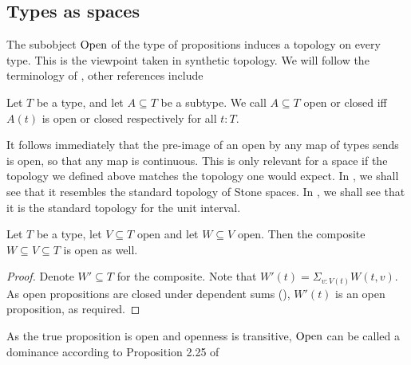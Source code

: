 \subsection{Types as spaces}
The subobject $\mathrm{Open}$ of the type of propositions induces a topology on every type. 
This is the viewpoint taken in synthetic topology. 
We will follow the terminology of \cite{SyntheticTopologyLesnik}, 
other references include \cite{SyntheticTopologyEscardo}%

\begin{definition}
  Let $T$ be a type, and let $A\subseteq T$ be a subtype. 
  We call $A\subseteq T$ open or closed iff $A(t)$ is open or closed respectively for all $t:T$.
\end{definition}

\begin{remark}
  It follows immediately that the pre-image of an open by any map of types sends is open, so that any map is continuous. 
  This is only relevant for a space if the topology we defined above matches the topology one would expect. 
  In , we shall see that it resembles the standard topology of Stone spaces.
  In , we shall see that it is the standard topology for the unit interval. 
\end{remark}

\begin{lemma}\label{OpenTransitive}
  Let $T$ be a type, let $V\subseteq T$ open and let $W\subseteq V$ open. 
  Then the composite $W\subseteq V\subseteq T$ is open as well. 
\end{lemma}
\begin{proof}
  Denote $W'\subseteq T$ for the composite. 
  Note that $W'(t) = \Sigma_{v:V(t)} W(t,v)$. 
  As open propositions are closed under dependent sums (), 
  $W'(t)$ is an open proposition, as required. 
\end{proof}

\begin{remark}\label{OpenDominance}
  As the true proposition is open and openness is transitive, 
  $\mathrm{Open}$ can be called a dominance according to Proposition 2.25 of \cite{SyntheticTopologyLesnik}
\end{remark}



